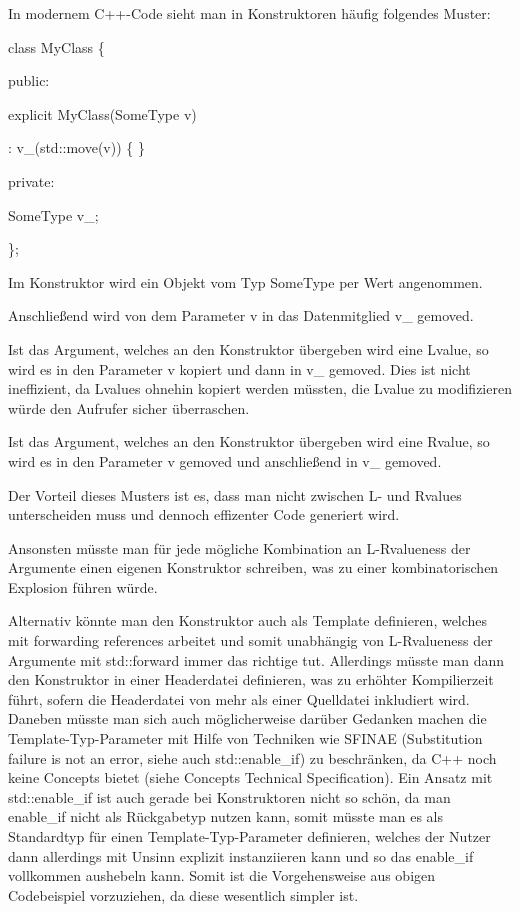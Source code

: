 \documentclass{article}
\begin{document}
\vspace{77pt}
In modernem C++-Code sieht man in Konstruktoren häufig folgendes Muster:

\vspace{12pt}
class MyClass \{

public:    

\parindent=14pt
explicit MyClass(SomeType v)        

\parindent=28pt
: v\_(std::move(v)) \{ \}

\parindent=0pt
private:    

\parindent=14pt
SomeType v\_;

\parindent=0pt
\};

\vspace{12pt}
Im Konstruktor wird ein Objekt vom Typ SomeType per Wert angenommen.

Anschließend wird von dem Parameter v in das Datenmitglied v\_ gemoved.

Ist das Argument, welches an den Konstruktor übergeben wird eine Lvalue, so wird 
es in den Parameter v kopiert und dann in v\_ gemoved. Dies ist nicht ineffizient, 
da Lvalues ohnehin kopiert werden müssten, die Lvalue zu modifizieren würde den 
Aufrufer sicher überraschen.

Ist das Argument, welches an den Konstruktor übergeben wird eine Rvalue, so wird 
es in den Parameter v gemoved und anschließend in v\_ gemoved.

Der Vorteil dieses Musters ist es, dass man nicht zwischen L- und Rvalues unterscheiden 
muss und dennoch effizenter Code generiert wird.

Ansonsten müsste man für jede mögliche Kombination an L-Rvalueness der Argumente 
einen eigenen Konstruktor schreiben, was zu einer kombinatorischen Explosion führen 
würde.

Alternativ könnte man den Konstruktor auch als Template definieren, welches mit 
forwarding references arbeitet und somit unabhängig von L-Rvalueness der Argumente 
mit std::forward immer das richtige tut. Allerdings müsste man dann den Konstruktor 
in einer Headerdatei definieren, was zu erhöhter Kompilierzeit führt, sofern 
die Headerdatei von mehr als einer Quelldatei inkludiert wird. Daneben müsste 
man sich auch möglicherweise darüber Gedanken machen die Template-Typ-Parameter 
mit Hilfe von Techniken wie SFINAE (Substitution failure is not an error, siehe 
auch std::enable\_if) zu beschränken, da C++ noch keine Concepts bietet (siehe 
Concepts Technical Specification). Ein Ansatz mit std::enable\_if ist auch gerade 
bei Konstruktoren nicht so schön, da man enable\_if nicht als Rückgabetyp nutzen 
kann, somit müsste man es als Standardtyp für einen Template-Typ-Parameter definieren, 
welches der Nutzer dann allerdings mit Unsinn explizit instanziieren kann und so 
das enable\_if vollkommen aushebeln kann. Somit ist die Vorgehensweise aus obigen 
Codebeispiel vorzuziehen, da diese wesentlich simpler ist.
\end{document}
